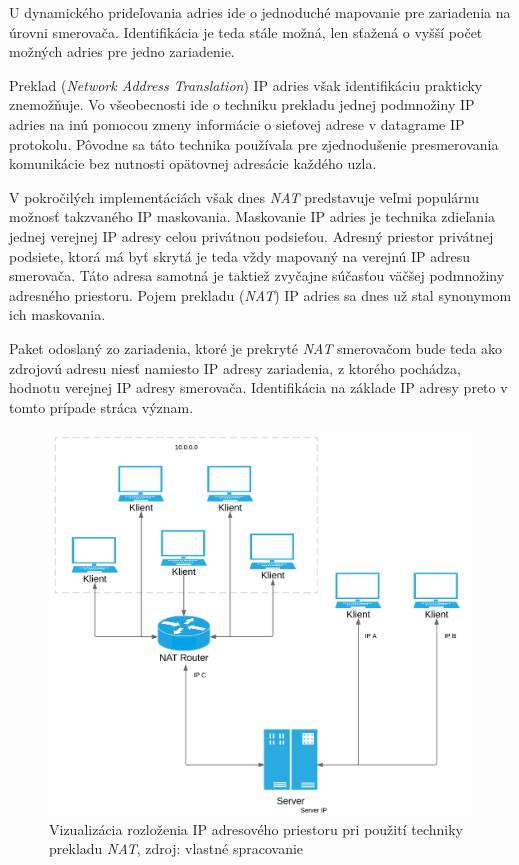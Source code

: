 \documentclass[
  digital, %
  table,   %
  lof,     %
  nolot,   %
  nocover
]{fithesis3}
\begin{document}
U dynamického prideľovania adries ide o jednoduché mapovanie pre zariadenia
na úrovni smerovača. Identifikácia je teda stále možná, len sťažená o vyšší
počet možných adries pre jedno zariadenie.

Preklad (\textit{Network Address Translation}) IP adries však identifikáciu
prakticky znemožňuje. Vo všeobecnosti ide o techniku prekladu jednej podmnožiny
IP adries na inú pomocou zmeny informácie o sieťovej adrese v datagrame IP
protokolu. Pôvodne sa táto technika používala pre zjednodušenie presmerovania
komunikácie bez nutnosti opätovnej adresácie každého uzla. 

V pokročilých
implementáciách však dnes \textit{NAT} predstavuje veľmi populárnu možnosť
takzvaného  IP maskovania. Maskovanie IP adries je technika zdieľania jednej
verejnej IP adresy celou privátnou podsieťou. Adresný priestor privátnej
podsiete, ktorá má byť skrytá je teda vždy mapovaný na verejnú IP adresu
smerovača. Táto adresa samotná je taktiež zvyčajne súčasťou väčšej podmnožiny
adresného priestoru. Pojem prekladu (\textit{NAT}) IP adries sa dnes už stal
synonymom ich maskovania. 

Paket odoslaný zo zariadenia, ktoré je prekryté
\textit{NAT} smerovačom bude teda ako zdrojovú adresu niesť namiesto IP adresy
zariadenia, z ktorého pochádza, hodnotu verejnej IP adresy smerovača.
Identifikácia na základe IP adresy preto v tomto prípade stráca význam.

\begin{figure}[H]
  \centering
    \includegraphics[width=.97\textwidth]{images/tech-IP-NAT.png}
  \caption{Vizualizácia rozloženia IP adresového priestoru pri použití techniky
  prekladu \textit{NAT}, zdroj: vlastné spracovanie}
  \label{fig:tech-IP-NAT}
\end{figure}
\end{document}
